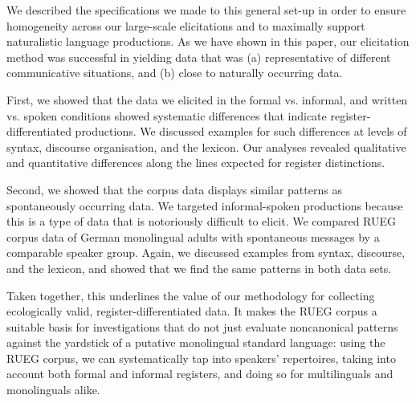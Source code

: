 \documentclass[output=paper,colorlinks,citecolor=brown]{langscibook}
\begin{document}
We described the specifications we made to this general set-up in order to ensure homogeneity across our large-scale elicitations and to maximally support naturalistic language productions. As we have shown in this paper, our elicitation method was successful in yielding data that was (a) representative of different communicative situations, and (b) close to naturally occurring data.

First, we showed that the data we elicited in the formal vs. informal, and written vs. spoken conditions showed systematic differences that indicate register-differentiated productions. We discussed examples for such differences at levels of syntax, discourse organisation, and the lexicon. Our analyses revealed qualitative and quantitative differences along the lines expected for register distinctions.

Second, we showed that the corpus data displays similar patterns as spontaneously occurring data. We targeted informal\hyp spoken productions because this is a type of data that is notoriously difficult to elicit. We compared RUEG corpus data of German monolingual adults with spontaneous messages by a comparable speaker group. Again, we discussed examples from syntax, discourse, and the lexicon, and showed that we find the same patterns in both data sets.

\begin{sloppypar}
Taken together, this underlines the value of our methodology for collecting ecologically valid, register\hyp differentiated data. It makes the RUEG corpus a suitable basis for investigations that do not just evaluate noncanonical patterns against the yardstick of a putative monolingual standard language: using the RUEG corpus, we can systematically tap into speakers’ repertoires, taking into account both formal and informal registers, and doing so for multilinguals and monolinguals alike.
\end{sloppypar}
\end{document}
